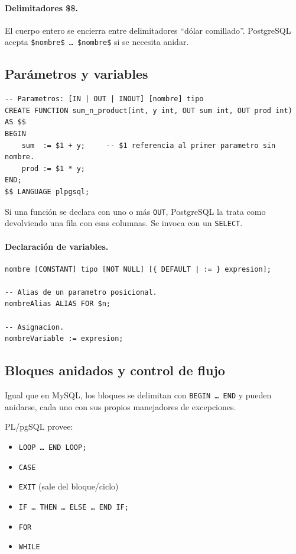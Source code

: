 \documentclass[11pt,a4paper]{article}
\begin{document}
\paragraph{Delimitadores \$\$.} El cuerpo entero se encierra entre
delimitadores ``dólar comillado''. PostgreSQL acepta
\texttt{\$nombre\$ \dots\ \$nombre\$} si se necesita anidar.

\subsection{Parámetros y variables}

\begin{lstlisting}
-- Parametros: [IN | OUT | INOUT] [nombre] tipo
CREATE FUNCTION sum_n_product(int, y int, OUT sum int, OUT prod int) AS $$
BEGIN
    sum  := $1 + y;     -- $1 referencia al primer parametro sin nombre.
    prod := $1 * y;
END;
$$ LANGUAGE plpgsql;
\end{lstlisting}

Si una función se declara con uno o más \texttt{OUT}, PostgreSQL la
trata como devolviendo una fila con esas columnas. Se invoca con un
\texttt{SELECT}.

\paragraph{Declaración de variables.}

\begin{lstlisting}
nombre [CONSTANT] tipo [NOT NULL] [{ DEFAULT | := } expresion];

-- Alias de un parametro posicional.
nombreAlias ALIAS FOR $n;

-- Asignacion.
nombreVariable := expresion;
\end{lstlisting}

\subsection{Bloques anidados y control de flujo}

Igual que en MySQL, los bloques se delimitan con
\texttt{BEGIN \dots\ END} y pueden anidarse, cada uno con sus
propios manejadores de excepciones.

PL/pgSQL provee:

\begin{itemize}
    \item \texttt{LOOP \dots\ END LOOP;}
    \item \texttt{CASE}
    \item \texttt{EXIT} (sale del bloque/ciclo)
    \item \texttt{IF \dots\ THEN \dots\ ELSE \dots\ END IF;}
    \item \texttt{FOR}
    \item \texttt{WHILE}
\end{itemize}
\end{document}
